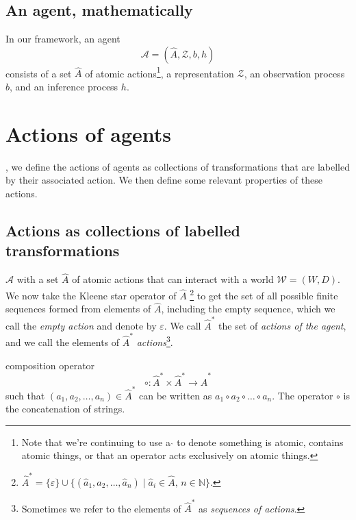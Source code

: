\subsection{An agent, mathematically}

In our framework, an agent
\begin{equation}
    \mathscr{A} = (\hat{A}, \mathscr{Z}, b, h)
\end{equation}
consists of a set $\hat{A}$ of atomic actions\footnote{
Note that we're continuing to use a $\hat{}$ to denote something is atomic, contains atomic things, or that an operator acts exclusively on atomic things.
}, a representation $\mathscr{Z}$, an observation process $b$, and an inference process $h$.

\section{Actions of agents}

, we define the actions of agents as collections of transformations that are labelled by their associated action.
We then define some relevant properties of these actions.

\subsection{Actions as collections of labelled transformations}

 $\mathscr{A}$ with a set $\hat{A}$ of atomic actions that can interact with a world $\mathscr{W} = (W, D)$.
We now take the Kleene star operator of $\hat{A}$ \footnote{
	$\hat{A}^{*} = \{ \varepsilon \} \cup \{ (\hat{a}_1, \hat{a}_2, \dots, \hat{a}_n) \mid \hat{a}_i \in \hat{A}, \, n \in \mathbb{N} \}$.
} to get the set of all possible finite sequences formed from elements of $\hat{A}$, including the empty sequence, which we call the \emph{empty action} and denote by $\varepsilon$.
We call $\hat{A}^{*}$ the set of \emph{actions of the agent}, and we call the elements of $\hat{A}^{*}$ \emph{actions}\footnote{
Sometimes we refer to the elements of $\hat{A}^{*}$ as \emph{sequences of actions}.
}.

 composition operator
\begin{equation}
	\circ: \hat{A}^{*} \times \hat{A}^{*} \to \hat{A}^{*}
\end{equation}
such that $(a_1, a_2, \dots, a_n) \in \hat{A}^{*}$ can be written as $a_1 \circ a_2 \circ \dots \circ a_n$.
The operator $\circ$ is the concatenation of strings.

